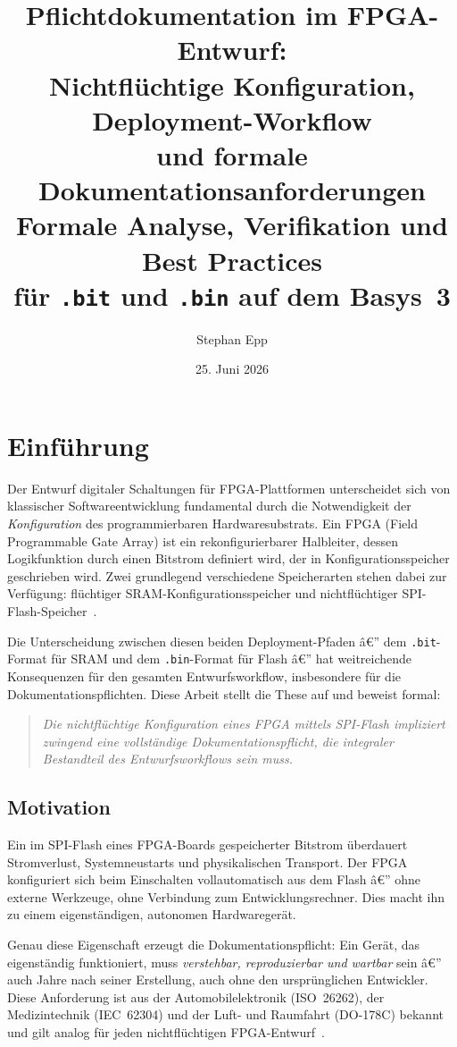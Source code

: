 ﻿\documentclass[a4paper,12pt]{article}
\title{Pflichtdokumentation im FPGA-Entwurf:\\
Nichtflüchtige Konfiguration, Deployment-Workflow\\
und formale Dokumentationsanforderungen\\\large
Formale Analyse, Verifikation und Best Practices\\
für \texttt{.bit} und \texttt{.bin} auf dem Basys~3}
\author{Stephan Epp}
\date{25. Juni 2026}
\theoremstyle{definition}
\begin{document}
\maketitle
\tableofcontents
\newpage

\section{Einführung}

Der Entwurf digitaler Schaltungen für FPGA-Plattformen unterscheidet sich von
klassischer Softwareentwicklung fundamental durch die Notwendigkeit der
\emph{Konfiguration} des programmierbaren Hardwaresubstrats. Ein FPGA
(Field Programmable Gate Array) ist ein rekonfigurierbarer Halbleiter,
dessen Logikfunktion durch einen Bitstrom definiert wird, der in
Konfigurationsspeicher geschrieben wird. Zwei grundlegend verschiedene
Speicherarten stehen dabei zur Verfügung: flüchtiger SRAM-Konfigurationsspeicher
und nichtflüchtiger SPI-Flash-Speicher~\cite{xilinx2019,digilent2023}.

Die Unterscheidung zwischen diesen beiden Deployment-Pfaden â€” dem
\texttt{.bit}-Format für SRAM und dem \texttt{.bin}-Format für Flash â€”
hat weitreichende Konsequenzen für den gesamten Entwurfsworkflow,
insbesondere für die Dokumentationspflichten. Diese Arbeit stellt die
These auf und beweist formal:

\begin{quote}
\emph{Die nichtflüchtige Konfiguration eines FPGA mittels SPI-Flash impliziert
zwingend eine vollständige Dokumentationspflicht, die integraler Bestandteil
des Entwurfsworkflows sein muss.}
\end{quote}

\subsection{Motivation}

Ein im SPI-Flash eines FPGA-Boards gespeicherter Bitstrom überdauert
Stromverlust, Systemneustarts und physikalischen Transport. Der FPGA
konfiguriert sich beim Einschalten vollautomatisch aus dem Flash â€” ohne
externe Werkzeuge, ohne Verbindung zum Entwicklungsrechner. Dies macht
ihn zu einem eigenständigen, autonomen Hardwaregerät.

Genau diese Eigenschaft erzeugt die Dokumentationspflicht: Ein Gerät,
das eigenständig funktioniert, muss \emph{verstehbar, reproduzierbar
und wartbar} sein â€” auch Jahre nach seiner Erstellung, auch ohne den
ursprünglichen Entwickler. Diese Anforderung ist aus der Automobilelektronik
(ISO~26262), der Medizintechnik (IEC~62304) und der Luft- und Raumfahrt
(DO-178C) bekannt und gilt analog für jeden nichtflüchtigen
FPGA-Entwurf~\cite{iso26262,iec62304}.
\end{document}
